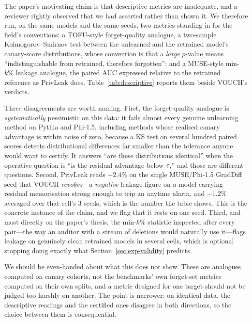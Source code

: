 The paper's motivating claim is that descriptive metrics are inadequate, and a
reviewer rightly observed that we had asserted rather than shown it. We therefore run,
on the same models and the same seeds, two metrics standing in for the field's
conventions: a TOFU-style forget-quality analogue, a two-sample Kolmogorov--Smirnov
test between the unlearned and the retrained model's canary-score distributions, whose
convention is that a \emph{large} $p$-value means ``indistinguishable from retrained,
therefore forgotten''; and a MUSE-style min-$k\%$ leakage analogue, the paired AUC
expressed relative to the retrained reference as PrivLeak does.
Table~\ref{tab:descriptive} reports them beside VOUCH's verdicts.

Three disagreements are worth naming. First, the forget-quality analogue is
\emph{systematically} pessimistic on this data: it fails almost every genuine
unlearning method on Pythia and Phi-1.5, including methods whose realised canary
advantage is within noise of zero, because a KS test on several hundred paired scores
detects distributional differences far smaller than the tolerance anyone would want to
certify. It answers ``are these distributions identical'' when the operative question
is ``is the residual advantage below $\varepsilon$,'' and those are different questions.
Second, PrivLeak reads $-2.4\%$ on the single MUSE/Phi-1.5 GradDiff seed that VOUCH
\emph{revokes}---a \emph{negative} leakage figure on a model carrying residual
memorisation strong enough to trip an anytime alarm, and $-1.2\%$ averaged over that
cell's $3$ seeds, which is the number the table shows. This is the concrete instance
of the claim, and we flag that it rests on one seed. Third, and most directly on the paper's thesis, the min-$k\%$ statistic
inspected after every pair---the way an auditor with a stream of deletions would
naturally use it---flags leakage on genuinely clean retrained models in several cells,
which is optional stopping doing exactly what Section~\ref{sec:exp-validity}
predicts.

We should be even-handed about what this does not show. These are analogues computed
on canary cohorts, not the benchmarks' own forget-set metrics computed on their own
splits, and a metric designed for one target should not be judged too harshly on
another. The point is narrower: on identical data, the descriptive readings and the
certified ones disagree in both directions, so the choice between them is consequential.

\begin{table}[t]
\centering\small
\caption{VOUCH verdicts beside descriptive metrics on the same runs and seeds.
``forget-KS'' is the TOFU-style forget-quality analogue (P = pass, F = fail, per seed);
``PrivLeak'' the MUSE-style min-$k\%$ leakage relative to the retrained reference;
``min-$k$ peek'' whether a min-$k\%$ test inspected after every pair ever flags leakage
(L) or not (\texttt{.}).}
\label{tab:descriptive}

\end{table}

